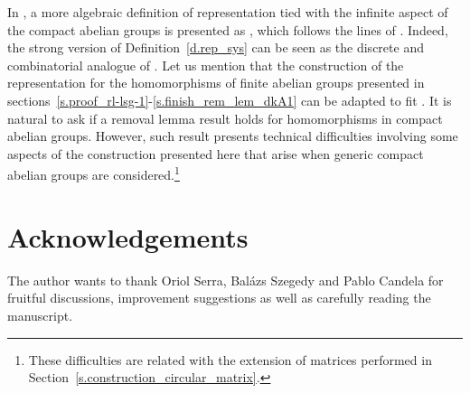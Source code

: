 \documentclass[10pt]{article}
\begin{document}
In \cite{canszeven14+}, a more algebraic definition of representation tied with the infinite aspect of the compact abelian groups is presented as \cite[Definition~3.7]{canszeven14+}, which follows the lines of \cite{sze10}. Indeed, the strong version of Definition~\ref{d.rep_sys} can be seen as the discrete and combinatorial analogue of \cite[Definition~3.7]{canszeven14+}. Let us mention that
the construction of the representation for the homomorphisms of finite abelian groups presented in sections~\ref{s.proof_rl-lsg-1}-\ref{s.finish_rem_lem_dkA1} can be adapted to fit \cite[Definition~3.7]{canszeven14+}. It is natural to ask if a removal lemma result holds for homomorphisms in compact abelian groups. However, such result presents technical difficulties involving some aspects of the construction presented here that arise when generic compact abelian groups are considered.\footnote{These difficulties are related with the extension of matrices performed in Section~\ref{s.construction_circular_matrix}.
}





\section*{Acknowledgements}

The author wants to thank Oriol Serra, Bal\'azs Szegedy and Pablo Candela for fruitful discussions, improvement suggestions as well as carefully reading the manuscript. 
\end{document}

